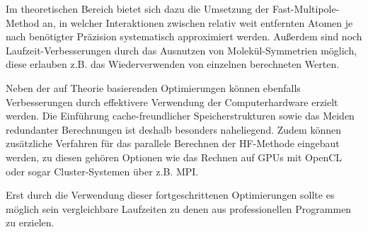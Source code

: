 Im theoretischen Bereich bietet sich dazu die Umsetzung der Fast-Multipole-Method an,
in welcher Interaktionen zwischen relativ weit entfernten Atomen
je nach benötigter Präzision systematisch approximiert werden.
Außerdem sind noch Laufzeit-Verbesserungen durch das Ausnutzen von Molekül-Symmetrien möglich,
diese erlauben z.B. das Wiederverwenden von einzelnen berechneten Werten.

Neben der auf Theorie basierenden Optimierungen können ebenfalls Verbesserungen
durch effektivere Verwendung der Computerhardware erzielt werden.
Die Einführung cache-freundlicher Speicherstrukturen sowie das Meiden redundanter
Berechnungen ist deshalb besonders naheliegend.
Zudem können zusätzliche Verfahren für das parallele Berechnen der HF-Methode eingebaut werden,
zu diesen gehören Optionen wie das Rechnen auf GPUs mit OpenCL\cite{opencl}
oder sogar Cluster-Systemen über z.B. MPI\cite{mpi}.

Erst durch die Verwendung dieser fortgeschrittenen Optimierungen sollte es möglich sein
vergleichbare Laufzeiten zu denen aus professionellen Programmen zu erzielen.
